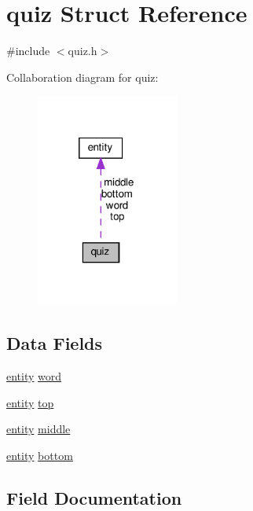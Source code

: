 \hypertarget{structquiz}{}\section{quiz Struct Reference}
\label{structquiz}


{\ttfamily \#include $<$quiz.\+h$>$}



Collaboration diagram for quiz\+:\nopagebreak
\begin{figure}[H]
\begin{center}
\leavevmode
\includegraphics[width=133pt]{structquiz__coll__graph}
\end{center}
\end{figure}
\subsection*{Data Fields}
\begin{DoxyCompactItemize}
\item 
\hyperlink{structentity}{entity} \hyperlink{structquiz_a1b17d6e71182a599abb2a3b721566738}{word}
\item 
\hyperlink{structentity}{entity} \hyperlink{structquiz_ad1183ce4a603358f7f9016913219e775}{top}
\item 
\hyperlink{structentity}{entity} \hyperlink{structquiz_a0528acd950fa1ec3b96679a018272f8c}{middle}
\item 
\hyperlink{structentity}{entity} \hyperlink{structquiz_a9c0a92bdf8150390cff6037818236b66}{bottom}
\end{DoxyCompactItemize}


\subsection{Field Documentation}
\mbox{\label{structquiz_a9c0a92bdf8150390cff6037818236b66}} 
